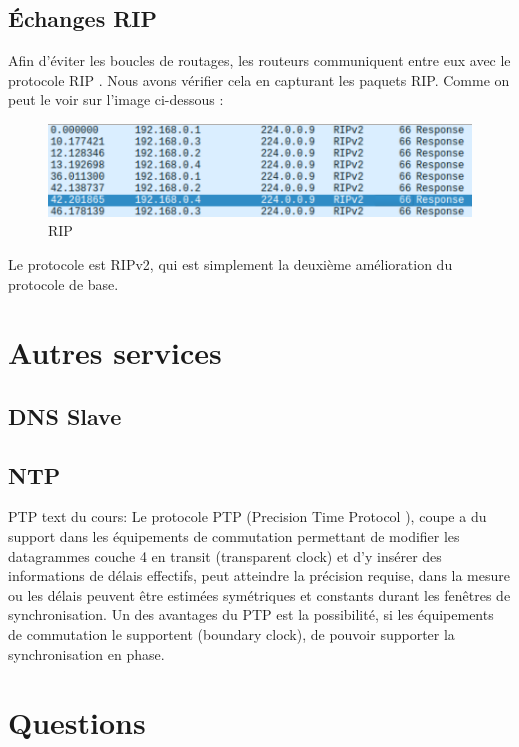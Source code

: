 \documentclass{article}
\begin{document}
\subsection{Échanges RIP}

Afin d'éviter les boucles de routages, les routeurs communiquent entre eux avec le protocole RIP \cite{RIP}. Nous avons vérifier cela en capturant les paquets RIP. Comme on peut le voir sur l'image ci-dessous :

\begin{figure}[h]
	\centering
	\includegraphics{./captures/rip.png}
	\caption{RIP}
	\label{fig:RIP}
\end{figure}

Le protocole est RIPv2, qui est simplement la deuxième amélioration du protocole de base.

\section{Autres services}

\subsection{DNS Slave}

\subsection{NTP}

PTP text du cours:
Le protocole PTP (Precision Time Protocol ), coupe a du support dans les équipements de commutation permettant de modifier les datagrammes couche 4 en transit (transparent clock) et d'y insérer des informations de délais effectifs, peut atteindre la précision requise, dans la mesure ou les délais peuvent être estimées symétriques et constants durant les fenêtres de synchronisation. Un des avantages du
PTP est la possibilité, si les équipements de commutation le supportent (boundary clock), de pouvoir supporter la synchronisation en phase.

\section{Questions}
\end{document}
